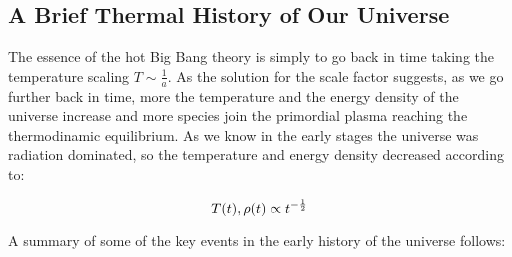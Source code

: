 \subsection{A Brief Thermal History of Our Universe}\label{ss:brief_thermal_history}

The essence of the hot Big Bang theory is simply to go back in time taking
the temperature scaling $T \sim \frac{1}{a}$. As the solution for the scale
factor suggests, as we go further back in time, more the temperature and
the energy density of the universe increase and more species join the
primordial plasma reaching the thermodinamic equilibrium. As we know in the
early stages the universe was radiation dominated, so the temperature and
energy density decreased according to:

\begin{equation}
        T\qty(t), \rho\qty(t) \propto t^{-\frac{1}{2}}
\end{equation}

A summary of some of the key events in the early history of the universe
follows:


